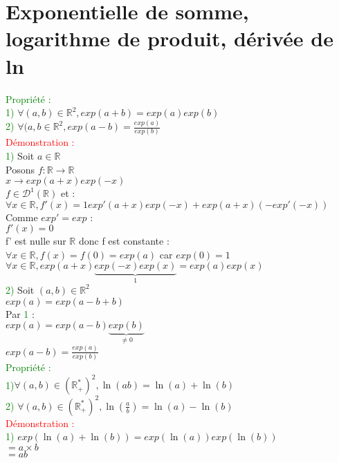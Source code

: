 \documentclass{article}
\begin{document}
	\section{Exponentielle de somme, logarithme de produit, dérivée de ln}
	\textcolor{green}{Propriété : }\\
	\textcolor{green}{1)} $\forall(a,b) \in \mathbb{R}^2,exp(a+b)=exp(a)exp(b)$ \\
	\textcolor{green}{2)} $\forall(a,b \in \mathbb{R}^2, exp(a-b)=\frac{exp(a)}{exp(b)}$ \\
	\textcolor{red}{Démonstration :} \\ \textcolor{green}{1)} Soit $a \in \mathbb{R}$ \\
Posons $f : \mathbb{R} \rightarrow \mathbb{R}$ \\
\indent $x \rightarrow exp(a+x)exp(-x)$ \\
$f \in \mathcal{D}^1(\mathbb{R})$ et :\\
\indent $\forall x \in \mathbb{R}, f'(x)=1exp'(a+x)exp(-x)	+ exp(a+x) (-exp'(-x))$ \\
Comme $exp'=exp$ : \\
\indent $f'(x)=0$ \\
f' est nulle sur $\mathbb{R}$ donc f est constante : \\
$\forall x \in \mathbb{R}, f(x)=f(0)=exp(a)$ car $exp(0)=1$ \\
$\forall x \in \mathbb{R}, exp(a+x) \underbrace{exp(-x)exp(x)}_{1} = exp(a)exp(x)$ \\
\textcolor{green}{2)} Soit $(a,b) \in \mathbb{R}^2$ \\
$exp(a)=exp(a-b+b)$ \\
Par \textcolor{green}{1} : \\
 $exp(a)=exp(a-b) \underbrace{exp(b)}_{\neq 0}$ \\
 $exp(a-b)=\frac{exp(a)}{exp(b)}$ \\
 \textcolor{green}{Propriété :} \\
 \textcolor{green}{1)}$\forall (a,b) \in (\mathbb{R}^*_+)^2, \ln(ab)=\ln(a) + \ln(b) $ \\
 \textcolor{green}{2)} $\forall (a,b) \in (\mathbb{R}^*_+)^2, \ln(\frac{a}{b})= \ln(a)-\ln(b)$ \\
 \textcolor{red}{Démonstration :} \\
 \textcolor{green}{1)} $exp(\ln(a)+\ln(b))= exp(\ln(a))exp(\ln(b))$ \\
 \indent $= a \times b$ \\
 \indent $= ab$ \\
\end{document}
